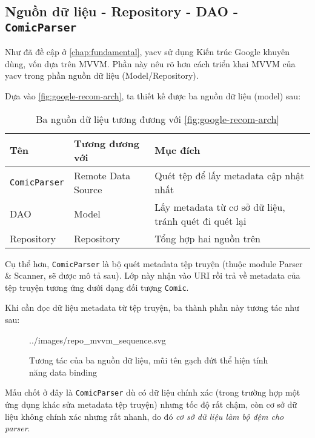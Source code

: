 \documentclass[../../../../thesis]{subfiles}
\begin{document}
\subsection{Nguồn dữ liệu - Repository - DAO - \texttt{ComicParser}}\label{sec:mvvm-design}

Như đã đề cập ở \autoref{chap:fundamental}, yacv sử dụng Kiến trúc Google khuyên
dùng, vốn dựa trên MVVM. Phần này nêu rõ hơn cách triển khai MVVM của yacv trong
phần nguồn dữ liệu (Model/Repository).

Dựa vào \autoref{fig:google-recom-arch}, ta thiết kế được ba nguồn dữ liệu
(model) sau:

\begin{table}[H]
    \centering
    \caption{Ba nguồn dữ liệu tương đương với \autoref{fig:google-recom-arch}}
    \label{tab:3-models}
    \begin{tabular}{l l l}
        \toprule
        Tên                  & Tương đương với    & Mục đích                                              \\
        \midrule
        \texttt{ComicParser} & Remote Data Source & Quét tệp để lấy metadata cập nhật nhất                \\
        DAO                  & Model              & Lấy metadata từ cơ sở dữ liệu, tránh quét đi quét lại \\
        Repository           & Repository         & Tổng hợp hai nguồn trên                               \\
        \bottomrule
    \end{tabular}
\end{table}

Cụ thể hơn, \texttt{ComicParser} là bộ quét metadata tệp truyện (thuộc module
Parser \& Scanner, sẽ được mô tả sau). Lớp này nhận vào URI rồi trả về metadata
của tệp truyện tương ứng dưới dạng đối tượng \texttt{Comic}.

Khi cần đọc dữ liệu metadata từ tệp truyện, ba thành phần này tương tác như sau:

\begin{figure}[H]
    \centering
    
    {../images/repo_mvvm_sequence.svg}
    \caption{Tương tác của ba nguồn dữ liệu, mũi tên gạch đứt thể hiện tính năng
        data binding}
    \label{fig:3-models}
\end{figure}

Mấu chốt ở đây là \texttt{ComicParser} dù có dữ liệu chính xác (trong trường hợp
một ứng dụng khác sửa metadata tệp truyện) nhưng tốc độ rất chậm, còn cơ sở dữ
liệu không chính xác nhưng rất nhanh, do đó \emph{cơ sở dữ liệu làm bộ đệm cho
    parser}.
\end{document}
